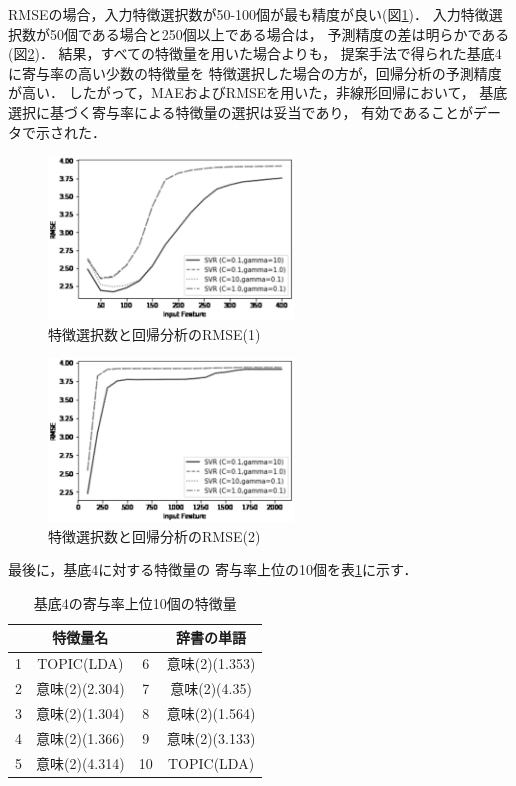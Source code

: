\documentclass[12pt,a4paper,twocolumn,twoside]{jsik}
\begin{document}
RMSEの場合，入力特徴選択数が50-100個が最も精度が良い(図\ref{fig:graf_rmse25-400_stackoverflow})．
入力特徴選択数が50個である場合と250個以上である場合は，
予測精度の差は明らかである(図\ref{fig:graf_rmse100-2000_stackoverflow})．
%
結果，すべての特徴量を用いた場合よりも，
提案手法で得られた基底4に寄与率の高い少数の特徴量を
特徴選択した場合の方が，回帰分析の予測精度が高い．
%
したがって，MAEおよびRMSEを用いた，非線形回帰において，
基底選択に基づく寄与率による特徴量の選択は妥当であり，
有効であることがデータで示された．
\newpage

\begin{figure}[htb]
  \begin{center}
    \includegraphics[width=6.5cm]{./eps/Regression-RMSE-RBF_25-400.eps}
    \caption{特徴選択数と回帰分析のRMSE(1)}
    \label{fig:graf_rmse25-400_stackoverflow}
  \end{center}
\end{figure}
%
\begin{figure}[htb]
  \begin{center}
    \includegraphics[width=6.5cm]{./eps/Regression-RMSE-RBF_2071.eps}
    \caption{特徴選択数と回帰分析のRMSE(2)}
    \label{fig:graf_rmse100-2000_stackoverflow}
  \end{center}
\end{figure}

最後に，基底4に対する特徴量の
寄与率上位の10個を表\ref{tab:nmf_h4_view}に示す．
\begin{table}[htb]
  \caption{基底4の寄与率上位10個の特徴量}
  \label{tab:nmf_h4_view}
  \begin{center}
  \begin{tabular}{|c|c|c|c|} \hline
    & 特徴量名 & & 辞書の単語 \\ \hline \hline
    1 & TOPIC(LDA) & 6 & 意味(2)(1.353) \\ \hline
    2 & 意味(2)(2.304) & 7 & 意味(2)(4.35) \\ \hline
    3 & 意味(2)(1.304) & 8 & 意味(2)(1.564) \\ \hline
    4 & 意味(2)(1.366) & 9 & 意味(2)(3.133) \\ \hline
    5 & 意味(2)(4.314) & 10 & TOPIC(LDA) \\ \hline
  \end{tabular}
  \end{center}
\end{table}
\end{document}
